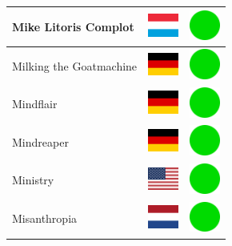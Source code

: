 \documentclass[12pt, a4paper, twoside]{report}
\begin{document}
\begin{center}
\begin{longtable}{|p{5cm}|p{2cm}|p{2cm}|}
 Mike Litoris Complot                                       & \includegraphics[width=1cm]{../4x3/lu} &   \includegraphics[width=1cm]{../likes/y} \\ \hline
 Milking the Goatmachine                                    & \includegraphics[width=1cm]{../4x3/de} &   \includegraphics[width=1cm]{../likes/y} \\ \hline
 Mindflair                                                  & \includegraphics[width=1cm]{../4x3/de} &   \includegraphics[width=1cm]{../likes/y} \\ \hline
 Mindreaper                                                 & \includegraphics[width=1cm]{../4x3/de} &   \includegraphics[width=1cm]{../likes/y} \\ \hline
 Ministry                                                   & \includegraphics[width=1cm]{../4x3/us} &   \includegraphics[width=1cm]{../likes/y} \\ \hline
 Misanthropia                                               & \includegraphics[width=1cm]{../4x3/nl} &   \includegraphics[width=1cm]{../likes/y} \\ \hline

\end{longtable}
\end{center}
\end{document}

